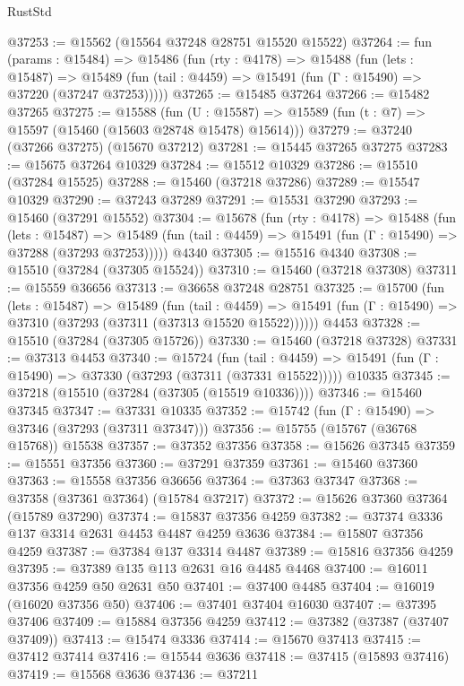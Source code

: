 \begin{lexlean}{RustStd}
\begin{coremodule}
@37253 := @15562 (@15564 @37248 @28751 @15520 @15522)
@37264 := fun (params : @15484) =>
  @15486
    (fun (rty : @4178) =>
    @15488
      (fun (lets : @15487) =>
      @15489 (fun (tail : @4459) => @15491 (fun (Γ : @15490) => @37220 (@37247 @37253)))))
@37265 := @15485 @37264
@37266 := @15482 @37265
@37275 := @15588
    (fun (U : @15587) => @15589 (fun (t : @7) => @15597 (@15460 (@15603 @28748 @15478) @15614)))
@37279 := @37240 (@37266 @37275) (@15670 @37212)
@37281 := @15445 @37265 @37275
@37283 := @15675 @37264 @10329
@37284 := @15512 @10329
@37286 := @15510 (@37284 @15525)
@37288 := @15460 (@37218 @37286)
@37289 := @15547 @10329
@37290 := @37243 @37289
@37291 := @15531 @37290
@37293 := @15460 (@37291 @15552)
@37304 := @15678
    (fun (rty : @4178) =>
    @15488
      (fun (lets : @15487) =>
      @15489 (fun (tail : @4459) => @15491 (fun (Γ : @15490) => @37288 (@37293 @37253)))))
    @4340
@37305 := @15516 @4340
@37308 := @15510 (@37284 (@37305 @15524))
@37310 := @15460 (@37218 @37308)
@37311 := @15559 @36656
@37313 := @36658 @37248 @28751
@37325 := @15700
    (fun (lets : @15487) =>
    @15489
      (fun (tail : @4459) =>
      @15491 (fun (Γ : @15490) => @37310 (@37293 (@37311 (@37313 @15520 @15522))))))
    @4453
@37328 := @15510 (@37284 (@37305 @15726))
@37330 := @15460 (@37218 @37328)
@37331 := @37313 @4453
@37340 := @15724
    (fun (tail : @4459) => @15491 (fun (Γ : @15490) => @37330 (@37293 (@37311 (@37331 @15522)))))
    @10335
@37345 := @37218 (@15510 (@37284 (@37305 (@15519 @10336))))
@37346 := @15460 @37345
@37347 := @37331 @10335
@37352 := @15742 (fun (Γ : @15490) => @37346 (@37293 (@37311 @37347)))
@37356 := @15755 (@15767 (@36768 @15768)) @15538
@37357 := @37352 @37356
@37358 := @15626 @37345
@37359 := @15551 @37356
@37360 := @37291 @37359
@37361 := @15460 @37360
@37363 := @15558 @37356 @36656
@37364 := @37363 @37347
@37368 := @37358 (@37361 @37364) (@15784 @37217)
@37372 := @15626 @37360 @37364 (@15789 @37290)
@37374 := @15837 @37356 @4259
@37382 := @37374 @3336 @137 @3314 @2631 @4453 @4487 @4259 @3636
@37384 := @15807 @37356 @4259
@37387 := @37384 @137 @3314 @4487
@37389 := @15816 @37356 @4259
@37395 := @37389 @135 @113 @2631 @16 @4485 @4468
@37400 := @16011 @37356 @4259 @50 @2631 @50
@37401 := @37400 @4485
@37404 := @16019 (@16020 @37356 @50)
@37406 := @37401 @37404 @16030
@37407 := @37395 @37406
@37409 := @15884 @37356 @4259
@37412 := @37382 (@37387 (@37407 @37409))
@37413 := @15474 @3336
@37414 := @15670 @37413
@37415 := @37412 @37414
@37416 := @15544 @3636
@37418 := @37415 (@15893 @37416)
@37419 := @15568 @3636
@37436 := @37211

\end{coremodule}
\end{lexlean}

